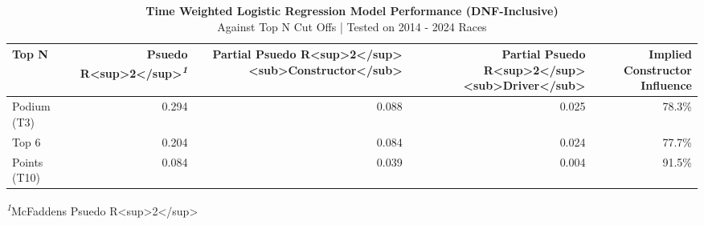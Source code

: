 \begin{table}[!t]
\caption*{
{\large \textbf{Time Weighted Logistic Regression Model Performance (DNF-Inclusive)}} \\ 
{\small Against Top N Cut Offs | Tested on 2014 - 2024 Races}
} 
\fontsize{10.5pt}{12.6pt}\selectfont
\begin{tabular*}{\linewidth}{@{\extracolsep{\fill}}lrrrr}
\toprule
Top N & Psuedo R<sup>2</sup>\textsuperscript{\textit{1}} & Partial Psuedo R<sup>2</sup><sub>Constructor</sub> & Partial Psuedo R<sup>2</sup><sub>Driver</sub> & Implied Constructor Influence \\ 
\midrule\addlinespace[2.5pt]
Podium (T3) & {0.294} & {0.088} & {0.025} & {78.3\%} \\ 
Top 6 & {0.204} & {0.084} & {0.024} & {77.7\%} \\ 
Points (T10) & {0.084} & {0.039} & {0.004} & {91.5\%} \\ 
\bottomrule
\end{tabular*}
\begin{minipage}{\linewidth}
\textsuperscript{\textit{1}}McFaddens Psuedo R<sup>2</sup>\\
\end{minipage}
\end{table}

